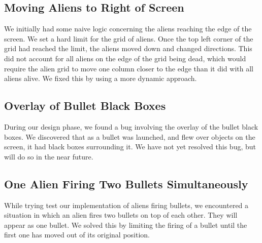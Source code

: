 \documentclass[11pt,letter,oneside]{report}
\begin{document}
\subsection{Moving Aliens to Right of Screen}
We initially had some naive logic concerning the aliens reaching the edge of the screen.  We set a hard limit for the grid of aliens.  Once the top left corner of the grid had reached the limit, the aliens moved down and changed directions.  This did not account for all aliens on the edge of the grid being dead, which would require the alien grid to move one column closer to the edge than it did with all aliens alive.  We fixed this by using a more dynamic approach.

\subsection{Overlay of Bullet Black Boxes}
During our design phase, we found a bug involving the overlay of the bullet black boxes. We discovered that as a bullet was launched, and flew over objects on the screen, it had black boxes surrounding it. We have not yet resolved this bug, but will do so in the near future.

\subsection{One Alien Firing Two Bullets Simultaneously}
While trying test our implementation of aliens firing bullets, we encountered a situation in which an alien fires two bullets on top of each other.  They will appear as one bullet.  We solved this by limiting the firing of a bullet until the first one has moved out of its original position. 
\end{document}
